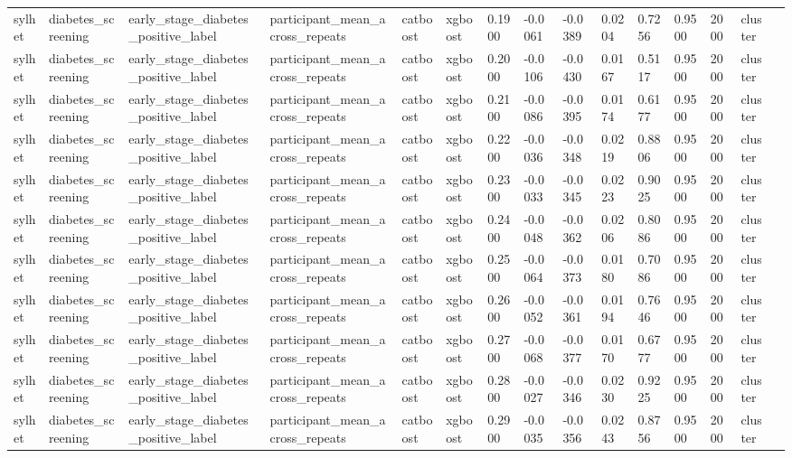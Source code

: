 \begin{tabular}{lllllllllllllll}
sylhet & diabetes\_screening & early\_stage\_diabetes\_positive\_label & participant\_mean\_across\_repeats & catboost & xgboost & 0.1900 & -0.0061 & -0.0389 & 0.0204 & 0.7256 & 0.9500 & 2000 & cluster &  \\
sylhet & diabetes\_screening & early\_stage\_diabetes\_positive\_label & participant\_mean\_across\_repeats & catboost & xgboost & 0.2000 & -0.0106 & -0.0430 & 0.0167 & 0.5117 & 0.9500 & 2000 & cluster &  \\
sylhet & diabetes\_screening & early\_stage\_diabetes\_positive\_label & participant\_mean\_across\_repeats & catboost & xgboost & 0.2100 & -0.0086 & -0.0395 & 0.0174 & 0.6177 & 0.9500 & 2000 & cluster &  \\
sylhet & diabetes\_screening & early\_stage\_diabetes\_positive\_label & participant\_mean\_across\_repeats & catboost & xgboost & 0.2200 & -0.0036 & -0.0348 & 0.0219 & 0.8806 & 0.9500 & 2000 & cluster &  \\
sylhet & diabetes\_screening & early\_stage\_diabetes\_positive\_label & participant\_mean\_across\_repeats & catboost & xgboost & 0.2300 & -0.0033 & -0.0345 & 0.0223 & 0.9025 & 0.9500 & 2000 & cluster &  \\
sylhet & diabetes\_screening & early\_stage\_diabetes\_positive\_label & participant\_mean\_across\_repeats & catboost & xgboost & 0.2400 & -0.0048 & -0.0362 & 0.0206 & 0.8086 & 0.9500 & 2000 & cluster &  \\
sylhet & diabetes\_screening & early\_stage\_diabetes\_positive\_label & participant\_mean\_across\_repeats & catboost & xgboost & 0.2500 & -0.0064 & -0.0373 & 0.0180 & 0.7086 & 0.9500 & 2000 & cluster &  \\
sylhet & diabetes\_screening & early\_stage\_diabetes\_positive\_label & participant\_mean\_across\_repeats & catboost & xgboost & 0.2600 & -0.0052 & -0.0361 & 0.0194 & 0.7646 & 0.9500 & 2000 & cluster &  \\
sylhet & diabetes\_screening & early\_stage\_diabetes\_positive\_label & participant\_mean\_across\_repeats & catboost & xgboost & 0.2700 & -0.0068 & -0.0377 & 0.0170 & 0.6777 & 0.9500 & 2000 & cluster &  \\
sylhet & diabetes\_screening & early\_stage\_diabetes\_positive\_label & participant\_mean\_across\_repeats & catboost & xgboost & 0.2800 & -0.0027 & -0.0346 & 0.0230 & 0.9225 & 0.9500 & 2000 & cluster &  \\
sylhet & diabetes\_screening & early\_stage\_diabetes\_positive\_label & participant\_mean\_across\_repeats & catboost & xgboost & 0.2900 & -0.0035 & -0.0356 & 0.0243 & 0.8756 & 0.9500 & 2000 & cluster &  \\

\end{tabular}

